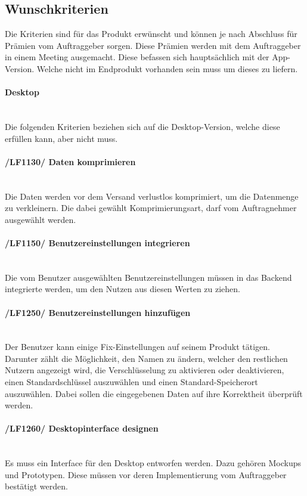 \subsection{Wunschkriterien}
Die Kriterien sind für das Produkt erwünscht und können je nach Abschluss für Prämien vom Auftraggeber sorgen. Diese Prämien werden mit dem Auftraggeber in einem Meeting ausgemacht. Diese befassen sich hauptsächlich mit der App-Version. Welche nicht im Endprodukt vorhanden sein muss um dieses zu liefern.
\begin{indentE}\mbox{}
	\paragraph{Desktop}\mbox{}\\
	Die folgenden Kriterien beziehen sich auf die Desktop-Version, welche diese erfüllen kann, aber nicht muss.
	\paragraph{/LF1130/ Daten komprimieren}\mbox{}\\
	Die Daten werden vor dem Versand verlustlos komprimiert, um die Datenmenge zu verkleinern. Die dabei gewählt Komprimierungsart, darf vom Auftragnehmer ausgewählt werden.
	\paragraph{/LF1150/ Benutzereinstellungen integrieren}\mbox{}\\
	Die vom Benutzer ausgewählten Benutzereinstellungen müssen in das Backend integrierte werden, um den Nutzen aus diesen Werten zu ziehen.
	\paragraph{/LF1250/ Benutzereinstellungen hinzufügen}\mbox{}\\
	Der Benutzer kann einige Fix-Einstellungen auf seinem Produkt tätigen. Darunter zählt die Möglichkeit, den Namen zu ändern, welcher den restlichen Nutzern angezeigt wird, die Verschlüsselung zu aktivieren oder deaktivieren, einen Standardschlüssel auszuwählen und einen Standard-Speicherort auszuwählen. Dabei sollen die eingegebenen Daten auf ihre Korrektheit überprüft werden.
	\paragraph{/LF1260/ Desktopinterface designen}\mbox{}\\
	Es muss ein Interface für den Desktop entworfen werden. Dazu gehören Mockups und Prototypen. Diese müssen vor deren Implementierung vom Auftraggeber bestätigt werden.

\end{indentE}
